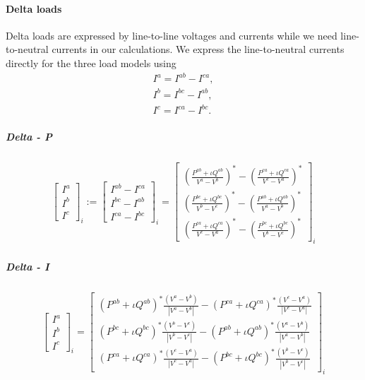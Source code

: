 \documentclass[10pt,journal]{article}
\begin{document}
\paragraph{Delta loads}
Delta loads are expressed by line-to-line voltages and currents while we need line-to-neutral currents in our calculations. We express the line-to-neutral currents directly for the three load models using \begin{align}
    I^a=I^{ab}-I^{ca},\\
    I^b=I^{bc}-I^{ab},\\
    I^c=I^{ca}-I^{bc}.
\end{align}
\subparagraph{Delta - P}
\begin{align}
\begin{bmatrix}
    I^a\\
    I^b\\
    I^c
    \end{bmatrix}_i := \begin{bmatrix}
    I^{ab}-I^{ca}\\
    I^{bc}-I^{ab}\\
    I^{ca}-I^{bc}
    \end{bmatrix}_i = \begin{bmatrix}
   (\frac{ P^{ab} +\iota Q^{ab}}{V^a-V^b})^* - (\frac{ P^{ca} +\iota Q^{ca}}{V^c-V^a})^* \\
    (\frac{ P^{bc} +\iota Q^{bc}}{V^b-V^c})^* - (\frac{ P^{ab} +\iota Q^{ab}}{V^a-V^b})^*\\
    (\frac{ P^{ca} +\iota Q^{ca}}{V^c-V^a})^* - (\frac{ P^{bc} +\iota Q^{bc}}{V^b-V^c})^*
    \end{bmatrix}_i 
    \end{align}
\subparagraph{Delta - I }
\begin{align}
\begin{bmatrix}
    I^a\\
    I^b\\
    I^c
    \end{bmatrix}_i = \begin{bmatrix}
    ({ P^{ab} +\iota Q^{ab}})^*\frac{(V^a-V^b)}{|V^a-V^b|} - ({ P^{ca} +\iota Q^{ca}})^*\frac{(V^c-V^a)}{|V^c-V^a|}  \\
    ({ P^{bc} +\iota Q^{bc}})^*\frac{(V^b-V^c)}{|V^b-V^c|} - ({ P^{ab} +\iota Q^{ab}})^*\frac{(V^a-V^b)}{|V^a-V^b|}\\
    ({ P^{ca} +\iota Q^{ca}})^*\frac{(V^c-V^a)}{|V^c-V^a|} -  ({ P^{bc} +\iota Q^{bc}})^*\frac{(V^b-V^c)}{|V^b-V^c|}
    \end{bmatrix}_i 
    \end{align}
    
\end{document}
